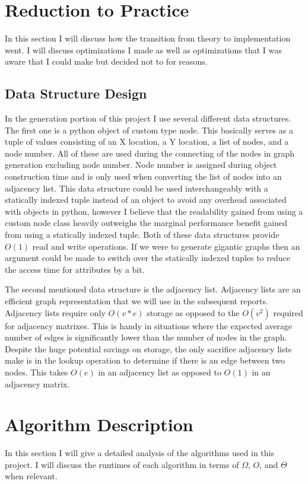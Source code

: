 \documentclass{article}
\begin{document}
  \section{Reduction to Practice}
		In this section I will discuss how the transition from theory to implementation went.  
		I will discuss optimizations I made as well as optimizations that I was aware that I could make but decided not to for reasons.
	\subsection{Data Structure Design}
		In the generation portion of this project I use several different data structures.
		The first one is a python object of custom type node.
		This basically serves as a tuple of values consisting of an X location, a Y location, a list of nodes, and a node number.
		All of these are used during the connecting of the nodes in graph generation excluding node number.
		Node number is assigned during object construction time and is only used when converting the list of nodes into an adjacency list.
		This data structure could be used interchangeably with a statically indexed tuple instead of an object to avoid any overhead associated with objects in python, however I believe that the readability gained from using a custom node class heavily outweighs the marginal performance benefit gained from using a statically indexed tuple.
		Both of these data structures provide $O(1)$ read and write operations.
		If we were to generate gigantic graphs then an argument could be made to switch over the statically indexed tuples to reduce the access time for attributes by a bit.

		The second mentioned data structure is the adjacency list.
		Adjacency lists are an efficient graph representation that we will use in the subsequent reports.
		Adjacency lists require only $O(v*e)$ storage as opposed to the $O(v^2)$ required for adjacency matrixes.
		This is handy in situations where the expected average number of edges is significantly lower than the number of nodes in the graph.
		Despite the huge potential savings on storage, the only sacrifice adjacency lists make is in the lookup operation to determine if there is an edge between two nodes.
		This takes $O(e)$ in an adjacency list as opposed to $O(1)$ in an adjacency matrix.

	\section{Algorithm Description}
		In this section I will give a detailed analysis of the algorithms used in this project.
		I will discuss the runtimes of each algorithm in terms of $\Omega$, $O$, and $\Theta$ when relevant.
\end{document}
